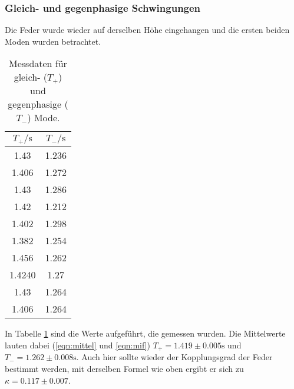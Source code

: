 \subsubsection{Gleich- und gegenphasige Schwingungen}
Die Feder wurde wieder auf derselben Höhe eingehangen und die ersten beiden Moden wurden betrachtet.
\begin{table}
    \centering
    \caption{Messdaten für gleich- ($T_{+}$) und gegenphasige ($T_{-}$) Mode.}
    \label{tab:g2}
    \begin{tabular}{c c}
     \toprule
     $T_{+} / \si{\s}$ & $T_{-} / \si{\s}$ \\
     \midrule
     1.43 & 1.236 \\
     1.406& 1.272 \\
     1.43 & 1.286 \\
     1.42 & 1.212 \\
     1.402& 1.298 \\
     1.382 & 1.254 \\
     1.456 & 1.262 \\
     1.4240 & 1.27 \\
     1.43 & 1.264 \\
     1.406 & 1.264 \\
     \bottomrule
    \end{tabular}
\end{table}
In Tabelle \ref{tab:g2} sind die Werte aufgeführt, die gemessen wurden. Die Mittelwerte lauten dabei (\eqref{eqn:mittel} und \eqref{eqn:mif}) $T_{+} = 1.419\pm 0.005\si{\s}$ und $T_{-} = 1.262\pm 0.008\si{\s}$. Auch hier sollte wieder der Kopplungsgrad 
der Feder bestimmt werden, mit derselben Formel wie oben ergibt er sich zu $\kappa = 0.117 \pm 0.007$.


